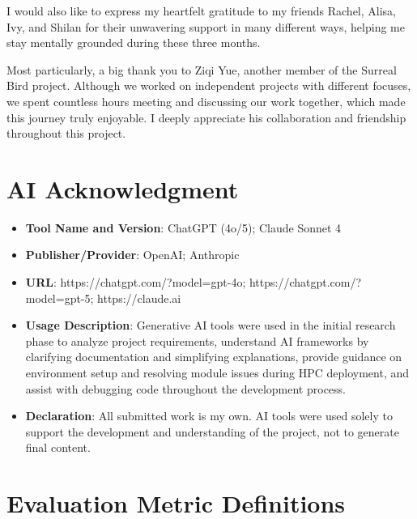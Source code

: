 \documentclass[final-report]{report-template}
\begin{document}
I would also like to express my heartfelt gratitude to my friends Rachel, Alisa, Ivy, and Shilan for their unwavering support in many different ways, helping me stay mentally grounded during these three months.

Most particularly, a big thank you to Ziqi Yue, another member of the Surreal Bird project. Although we worked on independent projects with different focuses, we spent countless hours meeting and discussing our work together, which made this journey truly enjoyable. I deeply appreciate his collaboration and friendship throughout this project.

\section*{AI Acknowledgment}
\begin{itemize}
    \item \textbf{Tool Name and Version}: ChatGPT (4o/5); Claude Sonnet 4
    \item \textbf{Publisher/Provider}: OpenAI; Anthropic
    \item \textbf{URL}: https://chatgpt.com/?model=gpt-4o; https://chatgpt.com/?model=gpt-5; https://claude.ai 
    \item \textbf{Usage Description}: Generative AI tools were used in the initial research phase to analyze project requirements, understand AI frameworks by clarifying documentation and simplifying explanations, provide guidance on environment setup and resolving module issues during HPC deployment, and assist with debugging code throughout the development process.
    \item \textbf{Declaration}: All submitted work is my own. AI tools were used solely to support the development and understanding of the project, not to generate final content.
\end{itemize}



\newpage



\newpage
\appendix

\section{Evaluation Metric Definitions}
\label{appendix:evaluation-math}
\end{document}

